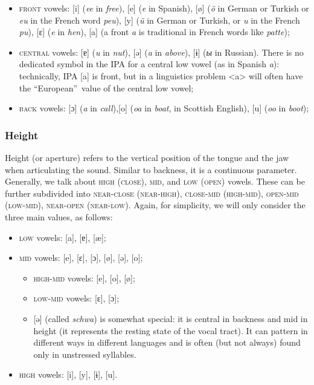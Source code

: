 \begin{refsection}
\begin{itemize}
    \item \textsc{front} vowels: [{i}] (\textit{ee} in \textit{free}), [{e}] (\textit{e} in Spanish), [{ø}] (\textit{ö} in German or Turkish or \textit{eu} in the French word \textit{peu}), [{y}] (\textit{ü} in German or Turkish, or \textit{u} in the French \textit{pu}), [{ɛ}] (\textit{e} in \textit{hen}),  [{a}] (a front \textit{a} is traditional in French words like \textit{patte});
    \item \textsc{central} vowels: [{ɐ}] (\textit{u} in \textit{nut}), [{ə}] (\textit{a} in \textit{above}), [{ɨ}] (\textit{ы} in Russian). There is no dedicated symbol in the IPA for a central low vowel (as in Spanish \textit{a}): technically, IPA [{a}] is front, but in a linguistics problem {<a>} will often have the “European”\ value of the central low vowel;
    \item \textsc{back} vowels: [{ɔ}] (\textit{a} in \textit{call}),[{o}] (\textit{oa} in \textit{boat}, in Scottish English), [{u}] (\textit{oo} in \textit{boot});
\end{itemize}

\subsubsection{Height}

Height (or aperture) refers to the vertical position of the tongue and the jaw when articulating the sound. Similar to backness, it is a continuous parameter. Generally, we talk about \textsc{high (close)}, \textsc{mid}, and \textsc{low (open)} vowels. These can be further subdivided into \textsc{near-close (near-high}), \textsc{close-mid (high-mid}), \textsc{open-mid (low-mid}), \textsc{near-open (near-low)}. Again, for simplicity, we will only consider the three main values, as follows:

\begin{itemize}
    \item \textsc{low} vowels: [{a}], [{ɐ}], [{æ}];
    \item \textsc{mid} vowels: [{e}], [{ɛ}], [{ɔ}], [{ø}], [{ə}], [{o}];
    \begin{itemize}
\item \textsc{high-mid} vowels: [{e}], [{o}], [{ø}];
\item \textsc{low-mid} vowels: [{ɛ}], [{ɔ}];
\item {[{ə}]} (called \textit{schwa}) is somewhat special: it is central in backness and mid in height (it represents the resting state of the vocal tract). It can pattern in different ways in different languages and is often (but not always) found only in unstressed syllables.
\end{itemize}
\item \textsc{high} vowels: [{i}], [{y}], [{ɨ}], [{u}].
    \end{itemize}


\end{refsection}
